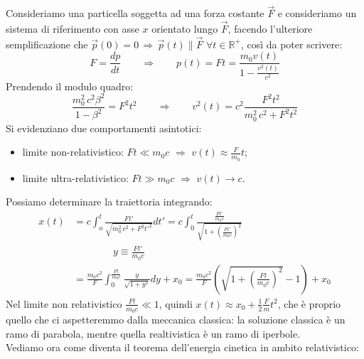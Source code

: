 Consideriamo una particella soggetta ad una forza costante $ \vec{F} $ e consideriamo un sistema di riferimento con asse $ x $ orientato lungo $ \vec{F} $, facendo l'ulteriore semplificazione che $ \vec{p}(0) = 0 \,\Rightarrow\, \vec{p}(t) \parallel \vec{F} \,\,\forall t\in\mathbb{R}^+$, così da poter scrivere:
\begin{equation}
	F = \displaystyle\frac{dp}{dt} \qquad \Longrightarrow \qquad p(t) = F t = \displaystyle\frac{m_0 v(t)}{1 - \frac{v^2(t)}{c^2}}
	\label{eq:18}
\end{equation}
Prendendo il modulo quadro:
\begin{equation}
	\displaystyle\frac{m_0^2 \, c^2 \beta^2}{1 - \beta^2} = F^2 t^2 \qquad \Longrightarrow \qquad v^2(t) = c^2 \displaystyle\frac{F^2 t^2}{m_0^2 \, c^2 + F^2 t^2}
	\label{eq:19}
\end{equation}
Si evidenziano due comportamenti asintotici:
\begin{itemize}
	\item limite non-relativistico: $ Ft \ll m_0 c \,\,\Rightarrow\,\, v(t) \approx \frac{F}{m_0}t$;
	\item limite ultra-relativistico: $ Ft \gg m_0 c \,\,\Rightarrow\,\, v(t) \rightarrow c $.
\end{itemize}
Possiamo determinare la traiettoria integrando:
\begin{equation}
	\begin{split}
		x(t) &= c \int_o^t \displaystyle\frac{Ft'}{\sqrt{{m_0^2 \, c^2 + F^2 t'^2}}} dt' = c \int_0^t \displaystyle\frac{\frac{Ft'}{m_0 c}}{\sqrt{1 + (\frac{F t'}{m_0 c})^2}} \\ 
		     & \qquad\qquad y \equiv \frac{F t'}{m_0 c} \\ 
		     &= \frac{m_0 c^2}{F} \int_0^{\frac{Ft}{m_0 c}} \displaystyle\frac{y}{\sqrt{1 + y^2}} dy + x_0 = \displaystyle\frac{m_0 c^2}{F} \left(\sqrt{1 + \left(\frac{F t}{m_0 c}\right)^2} - 1\right) + x_0
	\end{split}
	\label{eq:20}
\end{equation}
Nel limite non relativistico $ \frac{Ft}{m_0c} \ll 1 $, quindi $ x(t) \approx x_0 + \frac{1}{2}\frac{F}{m}t^2 $, che è proprio quello che ci aspetteremmo dalla meccanica classica: la soluzione classica è un ramo di parabola, mentre quella realtivistica è un ramo di iperbole. \\ 
%
Vediamo ora come diventa il teorema dell'energia cinetica in ambito relativistico:
